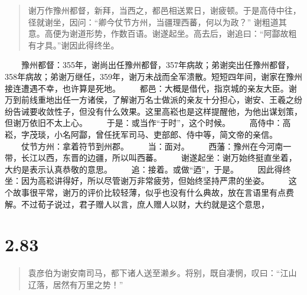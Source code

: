 \documentclass[]{book}
\begin{document}
\begin{quote}
谢万作豫州都督，新拜，当西之，都邑相送累日，谢疲顿。于是高侍中往，径就谢坐，因问：``卿今仗节方州，当疆理西蕃，何以为政？''
谢粗道其意。高便为谢道形势，作数百语。谢遂起坐。高去后，谢追曰：``阿酃故粗有才具。''谢因此得终坐。
\end{quote}

　　豫州都督：355年，谢尚出任豫州都督，357年病故；弟谢奕出任豫州都督，358年病故；弟谢万继任，359年，谢万未战而全军溃散。短短四年间，谢家在豫州接连遭遇不幸，也许算是死地。
　　都邑：大概是借代，指京城的亲友大臣。谢万到前线重地出任一方诸侯，了解谢万名士做派的亲友十分担心，谢安、王羲之纷纷告诫要收敛性子，但没有什么效果。这里高崧也是这样提醒他，为他出谋划策，但谢万依旧不太上心。
　　于是：或当作``于时''，这个时候。
　　高侍中：高崧，字茂琰，小名阿酃，曾任抚军司马、吏部郎、侍中等，简文帝的亲信。
　　仗节方州：拿着符节到州郡。 　　当：面对。
　　西藩：豫州在今河南一带，长江以西，东晋的边疆，所以叫西蕃。
　　谢遂起坐：谢万始终挺直坐着，大约是表示认真恭敬的意思。
　　追：接着。或做``迺''，于是。
　　因此得终坐：因为高崧讲得好，所以尽管谢万非常疲劳，但始终坚持严肃的坐姿。
　　这个故事很平常，谢万的评价比较轻薄，似乎也没有什么典故，放在言语里有点费解。不过荀子说过，君子赠人以言，庶人赠人以财，大约就是这个意思，

\section{2.83}\label{section-129}

\begin{quote}
袁彦伯为谢安南司马，都下诸人送至濑乡。将别，既自凄惘，叹曰：``江山辽落，居然有万里之势！''
\end{quote}
\end{document}
